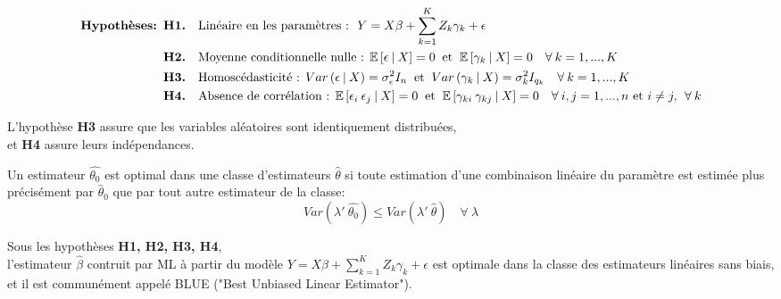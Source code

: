 \documentclass[11pt,fleqn]{book} %
\begin{document}
\begin{align*}
\textbf{Hypothèses: } &\textbf{H1.} \quad \textnormal{Linéaire en les paramètres : }\: Y=X\beta+\sum_{k=1}^{K} Z_k \gamma_k+\epsilon \\
&\textbf{H2.} \quad \textnormal{Moyenne conditionnelle nulle : } \mathbb{E}\left[\epsilon\:|\:X\right]=0\:\textnormal{ et }\: \mathbb{E}\left[\gamma_{k}\:|\:X\right]=0  \quad \forall\: k=1,...,K\\ 
&\textbf{H3.} \quad \textnormal{Homoscédasticité : }  Var\left(\epsilon\:|\:X\right)=\sigma_{\epsilon}^2 I_n  \:\textnormal{ et }\: Var\left(\gamma_{k}\:|\:X\right)=\sigma_k^2 I_{q_k}  \quad \forall\: k=1,...,K\\ 
&\textbf{H4.} \quad \textnormal{Absence de corrélation : }   \mathbb{E}\left[\epsilon_{i}\:\epsilon_{j}\:|\:X\right]=0 \:\textnormal{ et }\: \mathbb{E}\left[\gamma_{ki}\:\gamma_{kj}\:|\:X\right]=0  \quad \forall\: i,j=1,...,n \textnormal{ et } i\neq j,\:\: \forall\: k 
\end{align*}

\begin{remark}
L'hypothèse \textbf{H3} assure que les variables aléatoires sont identiquement distribuées,\\ et \textbf{H4} assure leurs indépendances.
\end{remark}

\vspace{1em}

\begin{definition}
Un estimateur $\hat{\theta_0}$ est optimal dans une classe d'estimateurs $\hat{\theta}$ si toute estimation d'une combinaison linéaire du paramètre est estimée plus précisément par $\hat{\theta}_0$ que par tout autre estimateur de la classe:
\[
Var(\lambda'\:\hat{\theta_0})\leq Var(\lambda'\:\hat{\theta}) \quad \forall\:\lambda
\]
\end{definition}

\vspace{2em}

\begin{theorem}
Sous les hypothèses \textbf{H1, H2, H3, H4},\\ 
l'estimateur $\hat{\beta}$ contruit par ML à partir du modèle $Y=X\beta+\sum_{k=1}^{K} Z_k \gamma_k +\epsilon$ est optimale dans la classe des estimateurs linéaires sans biais, et il est communément appelé BLUE ("Best Unbiased Linear Estimator").
\end{theorem}
\end{document}
